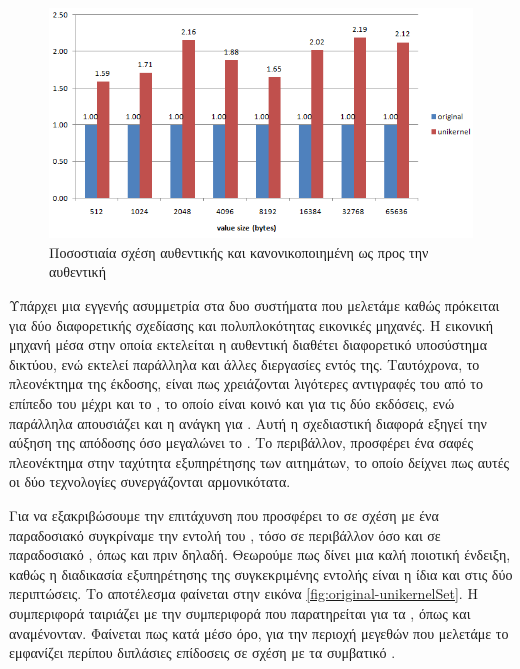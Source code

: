 \begin{figure}[h]
  \includegraphics[width=\textwidth]{pictures/secondBenchmarkResults2.PNG}
  \caption{Ποσοστιαία σχέση αυθεντικής  και  κανονικοποιημένη ως προς
  την αυθεντική}
  \label{fig:original-unikernelPercentage}
\end{figure}

Υπάρχει μια εγγενής ασυμμετρία στα δυο συστήματα που μελετάμε καθώς πρόκειται
για δύο διαφορετικής σχεδίασης και πολυπλοκότητας εικονικές μηχανές. Η εικονική μηχανή μέσα
στην οποία εκτελείται η αυθεντική  διαθέτει διαφορετικό υποσύστημα δικτύου, ενώ εκτελεί παράλληλα
και άλλες διεργασίες εντός της. Ταυτόχρονα, το πλεονέκτημα της  έκδοσης,
είναι πως χρειάζονται λιγότερες αντιγραφές του  από το επίπεδο του
 μέχρι και το , το οποίο είναι κοινό και για τις δύο εκδόσεις, ενώ παράλληλα απουσιάζει και η
ανάγκη για . Αυτή η σχεδιαστική διαφορά εξηγεί την αύξηση της απόδοσης όσο μεγαλώνει το .
Το  περιβάλλον, προσφέρει ένα σαφές πλεονέκτημα στην ταχύτητα εξυπηρέτησης
των αιτημάτων, το οποίο δείχνει πως αυτές οι δύο τεχνολογίες συνεργάζονται αρμονικότατα.
\newline

Για να εξακριβώσουμε την επιτάχυνση που προσφέρει το  σε σχέση με
ένα παραδοσιακό  συγκρίναμε την εντολή  του , τόσο σε 
περιβάλλον όσο και σε παραδοσιακό , όπως και πριν δηλαδή.
Θεωρούμε πως δίνει μια καλή ποιοτική ένδειξη, καθώς η διαδικασία εξυπηρέτησης της συγκεκριμένης εντολής είναι η ίδια
και στις δύο περιπτώσεις. Το αποτέλεσμα φαίνεται στην εικόνα \ref{fig:original-unikernelSet}. Η συμπεριφορά ταιριάζει με την συμπεριφορά που παρατηρείται
για τα , όπως και αναμένονταν. Φαίνεται πως κατά μέσο όρο, για την περιοχή μεγεθών
που μελετάμε το  εμφανίζει περίπου διπλάσιες επίδοσεις σε σχέση με τα συμβατικό .


